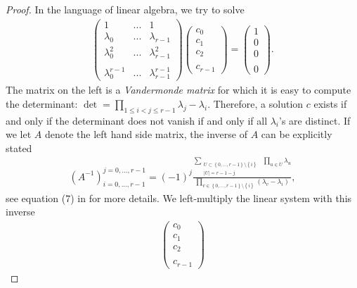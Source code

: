 \begin{proof}
    In the language of linear algebra, we try to solve
    \begin{align*}
        \begin{pmatrix}
            1 & ... & 1 \\
            \lambda_0 & ... & \lambda_{r-1} \\
            \lambda_0^2 & ... & \lambda_{r-1}^2 \\
            & & \\
            \lambda_0^{r-1} & ... & \lambda_{r-1}^{r-1}
        \end{pmatrix}
        \begin{pmatrix}
            c_0 \\ c_1 \\ c_2 \\ \\ c_{r-1}
        \end{pmatrix}
        = 
        \begin{pmatrix}
            1 \\ 0 \\ 0 \\ \\ 0
        \end{pmatrix}.
    \end{align*}
    The matrix on the left is a \emph{Vandermonde matrix} for which it is easy to compute the determinant: $\det = \prod_{1 \leq i < j \leq r - 1} \lambda_j  - \lambda_i$. Therefore, a solution $c$ exists if and only if the determinant does not vanish if and only if all $\lambda_i$'s are distinct. If we let $A$ denote the left hand side matrix, the inverse of $A$  can be explicitly stated 
    \begin{align*}
        (A^{-1})_{i=0,...,r-1}^{j=0,...,r-1} = (-1)^j \frac{\sum\limits_{\substack{U \subset \left\{ 0,...,r-1 \right\} \setminus \left\{ i \right\} \\ |U| = r - 1 -j}} \; \prod\limits_{u \in U} \lambda_u}{\prod\limits_{v \in \left\{ 0,...,r-1 \right\} \setminus \left\{ i \right\}} (\lambda_v - \lambda_i)},
    \end{align*}
    see equation (7) in \cite{klinger1965vandermonde} for more details. We left-multiply the linear system with this inverse
    \begin{align*}
        \begin{pmatrix}
            c_0 \\ c_1 \\ c_2 \\ \\ c_{r-1}

\end{pmatrix}
\end{align*}
\end{proof}
